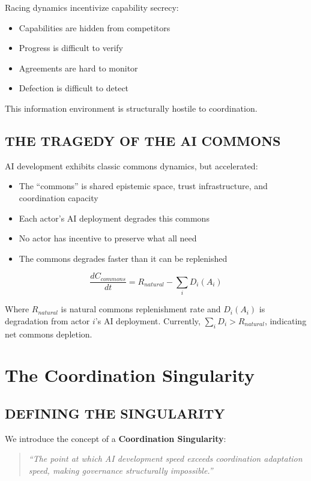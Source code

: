 \documentclass[11pt,letterpaper]{article}
\begin{document}
Racing dynamics incentivize capability secrecy:
\begin{itemize}
\item Capabilities are hidden from competitors
\item Progress is difficult to verify
\item Agreements are hard to monitor
\item Defection is difficult to detect
\end{itemize}

This information environment is structurally hostile to coordination.

\subsection{THE TRAGEDY OF THE AI COMMONS}

AI development exhibits classic commons dynamics, but accelerated:
\begin{itemize}
\item The ``commons'' is shared epistemic space, trust infrastructure, and coordination capacity
\item Each actor's AI deployment degrades this commons
\item No actor has incentive to preserve what all need
\item The commons degrades faster than it can be replenished
\end{itemize}

\begin{equation}
\frac{dC_{commons}}{dt} = R_{natural} - \sum_i D_i(A_i)
\label{eq:commons}
\end{equation}

Where $R_{natural}$ is natural commons replenishment rate and $D_i(A_i)$ is degradation from actor $i$'s AI deployment. Currently, $\sum_i D_i > R_{natural}$, indicating net commons depletion.

\section{The Coordination Singularity}

\subsection{DEFINING THE SINGULARITY}

We introduce the concept of a \textbf{Coordination Singularity}:

\begin{quote}
\textit{``The point at which AI development speed exceeds coordination adaptation speed, making governance structurally impossible.''}
\end{quote}
\end{document}
